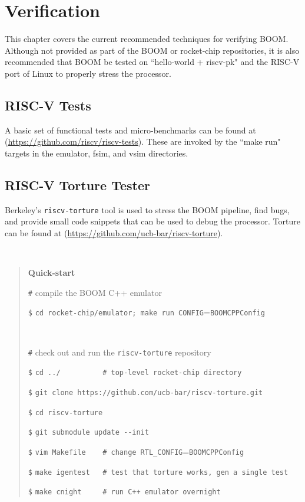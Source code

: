 \chapter{Verification}

This chapter covers the current recommended techniques for verifying BOOM.  Although not provided as part of the BOOM or rocket-chip repositories, it is also recommended that BOOM be tested on ``hello-world + riscv-pk" and the RISC-V port of Linux to properly stress the processor.

\section{RISC-V Tests}

A basic set of functional tests and micro-benchmarks can be found at (\url{https://github.com/riscv/riscv-tests}).  These are invoked by the ``make run" targets in the emulator, fsim, and vsim directories. 

\section{RISC-V Torture Tester}

Berkeley's {\tt riscv-torture} tool is used to stress the BOOM pipeline, find bugs, and provide small code snippets that can be used to debug the processor. Torture can be found at (\url{https://github.com/ucb-bar/riscv-torture}).

\

\begin{quote}
{\bf Quick-start}

\texttt{\#} compile the BOOM C++ emulator

\texttt{\$} \verb=cd rocket-chip/emulator; make run CONFIG==\verb=BOOMCPPConfig=

\

\texttt{\#} check out and run the {\tt riscv-torture} repository

\texttt{\$} \verb=cd ../          # top-level rocket-chip directory=

\texttt{\$} \verb=git clone https://github.com/ucb-bar/riscv-torture.git=

\texttt{\$} \verb=cd riscv-torture=

\texttt{\$} \verb=git submodule update --init=

\texttt{\$} \verb=vim Makefile    # change RTL_CONFIG==\verb=BOOMCPPConfig=

\texttt{\$} \verb=make igentest   # test that torture works, gen a single test=

\texttt{\$} \verb=make cnight     # run C++ emulator overnight=
\end{quote}


